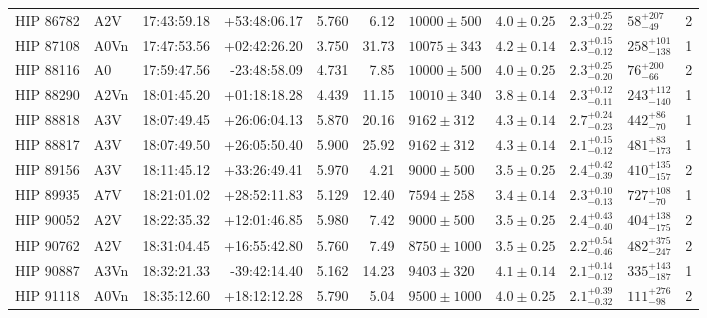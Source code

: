 \begin{landscape}
\begin{scriptsize}
\begin{longtable}{|l|lrrrrlllll|}
   HIP 86782 &      A2V &    17:43:59.18 &   +53:48:06.17 &   5.760 &      6.12 &   $10000 \pm 500$ &  $4.0 \pm 0.25$ &  $2.3^{+0.25}_{-0.22}$ &     $58^{+207}_{-49}$ &       2 \\
   HIP 87108 &     A0Vn &    17:47:53.56 &   +02:42:26.20 &   3.750 &     31.73 &   $10075 \pm 343$ &  $4.2 \pm 0.14$ &  $2.3^{+0.15}_{-0.12}$ &   $258^{+101}_{-138}$ &       1 \\
   HIP 88116 &       A0 &    17:59:47.56 &   -23:48:58.09 &   4.731 &      7.85 &   $10000 \pm 500$ &  $4.0 \pm 0.25$ &  $2.3^{+0.25}_{-0.20}$ &     $76^{+200}_{-66}$ &       2 \\
   HIP 88290 &     A2Vn &    18:01:45.20 &   +01:18:18.28 &   4.439 &     11.15 &   $10010 \pm 340$ &  $3.8 \pm 0.14$ &  $2.3^{+0.12}_{-0.11}$ &   $243^{+112}_{-140}$ &       1 \\
   HIP 88818 &      A3V &    18:07:49.45 &   +26:06:04.13 &   5.870 &     20.16 &    $9162 \pm 312$ &  $4.3 \pm 0.14$ &  $2.7^{+0.24}_{-0.23}$ &     $442^{+86}_{-70}$ &       1 \\
   HIP 88817 &      A3V &    18:07:49.50 &   +26:05:50.40 &   5.900 &     25.92 &    $9162 \pm 312$ &  $4.3 \pm 0.14$ &  $2.1^{+0.15}_{-0.12}$ &    $481^{+83}_{-173}$ &       1 \\
   HIP 89156 &      A3V &    18:11:45.12 &   +33:26:49.41 &   5.970 &      4.21 &    $9000 \pm 500$ &  $3.5 \pm 0.25$ &  $2.4^{+0.42}_{-0.39}$ &   $410^{+135}_{-157}$ &       2 \\
   HIP 89935 &      A7V &    18:21:01.02 &   +28:52:11.83 &   5.129 &     12.40 &    $7594 \pm 258$ &  $3.4 \pm 0.14$ &  $2.3^{+0.10}_{-0.13}$ &    $727^{+108}_{-70}$ &       1 \\
   HIP 90052 &      A2V &    18:22:35.32 &   +12:01:46.85 &   5.980 &      7.42 &    $9000 \pm 500$ &  $3.5 \pm 0.25$ &  $2.4^{+0.43}_{-0.40}$ &   $404^{+138}_{-175}$ &       2 \\
   HIP 90762 &      A2V &    18:31:04.45 &   +16:55:42.80 &   5.760 &      7.49 &   $8750 \pm 1000$ &  $3.5 \pm 0.25$ &  $2.2^{+0.54}_{-0.46}$ &   $482^{+375}_{-247}$ &       2 \\
   HIP 90887 &     A3Vn &    18:32:21.33 &   -39:42:14.40 &   5.162 &     14.23 &    $9403 \pm 320$ &  $4.1 \pm 0.14$ &  $2.1^{+0.14}_{-0.12}$ &   $335^{+143}_{-187}$ &       1 \\
   HIP 91118 &     A0Vn &    18:35:12.60 &   +18:12:12.28 &   5.790 &      5.04 &   $9500 \pm 1000$ &  $4.0 \pm 0.25$ &  $2.1^{+0.39}_{-0.32}$ &    $111^{+276}_{-98}$ &       2 \\

\end{longtable}
\end{scriptsize}
\end{landscape}
